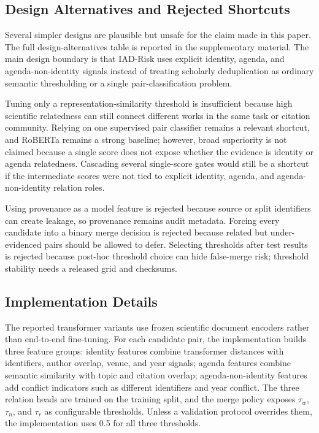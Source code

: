 \documentclass[11pt]{article}
\begin{document}
\subsection{Design Alternatives and Rejected Shortcuts}

Several simpler designs are plausible but unsafe for the claim made in this paper. The full design-alternatives table is reported in the supplementary material. The main design boundary is that IAD-Risk uses explicit identity, agenda, and agenda-non-identity signals instead of treating scholarly deduplication as ordinary semantic thresholding or a single pair-classification problem.

Tuning only a representation-similarity threshold is insufficient because high scientific relatedness can still connect different works in the same task or citation community. Relying on one supervised pair classifier remains a relevant shortcut, and RoBERTa remains a strong baseline; however, broad superiority is not claimed because a single score does not expose whether the evidence is identity or agenda relatedness. Cascading several single-score gates would still be a shortcut if the intermediate scores were not tied to explicit identity, agenda, and agenda-non-identity relation roles.

Using provenance as a model feature is rejected because source or split identifiers can create leakage, so provenance remains audit metadata. Forcing every candidate into a binary merge decision is rejected because related but under-evidenced pairs should be allowed to defer. Selecting thresholds after test results is rejected because post-hoc threshold choice can hide false-merge risk; threshold stability needs a released grid and checksums.

\subsection{Implementation Details}

The reported transformer variants use frozen scientific document encoders rather than end-to-end fine-tuning. For each candidate pair, the implementation builds three feature groups: identity features combine transformer distances with identifiers, author overlap, venue, and year signals; agenda features combine semantic similarity with topic and citation overlap; agenda-non-identity features add conflict indicators such as different identifiers and year conflict. The three relation heads are trained on the training split, and the merge policy exposes $\tau_w$, $\tau_n$, and $\tau_r$ as configurable thresholds. Unless a validation protocol overrides them, the implementation uses 0.5 for all three thresholds.
\end{document}
